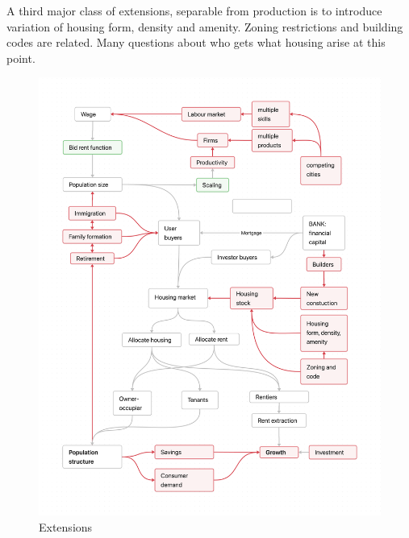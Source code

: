 A third major class of extensions, separable from production is to introduce variation of housing form,  density and amenity. Zoning restrictions and building codes are related. Many questions about who gets what housing arise at this point. 

{\newpage\thispagestyle{empty}
\vspace{-1.5cm}
\begin{figure}
\vspace{-4.5cm}
\begin{adjustwidth}{-0.24\textwidth}{-0.2\textwidth}
\centering
\includegraphics[scale=.22]{fig/extensions-logic.png}
\end{adjustwidth}
\caption{Extensions}
\label{fig-extensions-logic}
\end{figure}}


